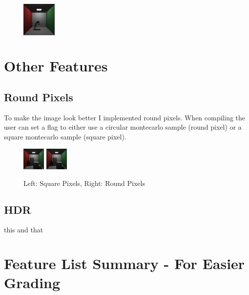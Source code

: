 \documentclass{article}
\begin{document}
        \begin{figure}[h!]
            \centering
            \includegraphics[width=0.15\textwidth]{samples/MotionBlur.png}
        \end{figure}



\section{Other Features}

    \subsection{Round Pixels}
    To make the image look better I implemented round pixels. When compiling the user can set a flag to either use a circular montecarlo sample (round pixel) or a square montecarlo sample (square pixel). \par

    \begin{figure}
        \centering
        \includegraphics[width=0.1\textwidth]{samples/SquarePixels.png}
        \includegraphics[width=0.1\textwidth]{samples/CornellRoundPixels.png}
        \caption{Left: Square Pixels, Right: Round Pixels}
    \end{figure}

    \subsection{HDR}
    this and that \par

\section{Feature List Summary - For Easier Grading}
\end{document}
